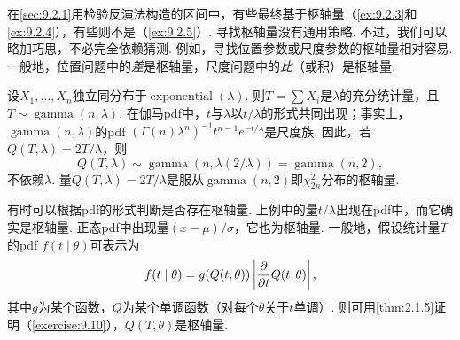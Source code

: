 在\autoref{sec:9.2.1}用检验反演法构造的区间中，有些最终基于枢轴量（\autoref{ex:9.2.3}和\autoref{ex:9.2.4}），有些则不是（\autoref{ex:9.2.5}）. 寻找枢轴量没有通用策略. 不过，我们可以略加巧思，不必完全依赖猜测. 例如，寻找位置参数或尺度参数的枢轴量相对容易. 一般地，位置问题中的\emph{差}是枢轴量，尺度问题中的\emph{比}（或积）是枢轴量.
\begin{example}[伽马枢轴量]\label{ex:9.2.8}
设$X_1,\ldots,X_n$独立同分布于$\operatorname{exponential}(\lambda)$. 则$T=\sum X_i$是$\lambda$的充分统计量，且$T\sim\operatorname{gamma}(n,\lambda)$. 在伽马pdf中，$t$与$\lambda$以$t/\lambda$的形式共同出现；事实上，$\operatorname{gamma}(n,\lambda)$的pdf $(\Gamma(n)\lambda^n)^{-1}t^{n-1}e^{-t/\lambda}$是尺度族. 因此，若$Q(T,\lambda)=2T/\lambda$，则
$$Q(T,\lambda)\sim\operatorname{gamma}(n,\lambda(2/\lambda))=\operatorname{gamma}(n,2),$$
不依赖$\lambda$. 量$Q(T,\lambda)=2T/\lambda$是服从$\operatorname{gamma}(n,2)$即$\chi^2_{2n}$分布的枢轴量.
\end{example}
有时可以根据pdf的形式判断是否存在枢轴量. 上例中的量$t/\lambda$出现在pdf中，而它确实是枢轴量. 正态pdf中出现量$(x-\mu)/\sigma$，它也为枢轴量. 一般地，假设统计量$T$的pdf $f(t\mid\theta)$可表示为
\begin{equation}\label{eq:9.2.11}\index{SI0758@一般形式}
f(t\mid\theta)=g(Q(t,\theta))\left|\frac\partial{\partial t}Q(t,\theta)\right|,
\end{equation}
其中$g$为某个函数，$Q$为某个单调函数（对每个$\theta$关于$t$单调）. 则可用\autoref{thm:2.1.5}证明（\autoref{exercise:9.10}），$Q(T,\theta)$是枢轴量.

